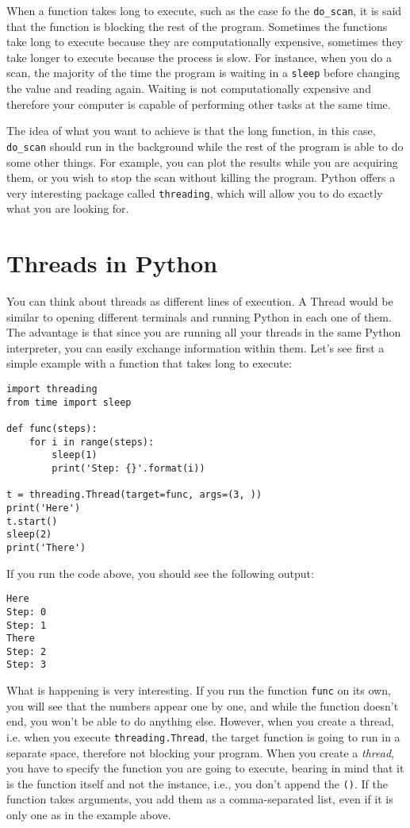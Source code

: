 When a function takes long to execute, such as the case fo the
\texttt{do_scan}, it is said that the function is blocking the rest of
the program. Sometimes the functions take long to execute because they
are computationally expensive, sometimes they take longer to execute
because the process is slow. For instance, when you do a scan, the
majority of the time the program is waiting in a \texttt{sleep} before
changing the value and reading again. Waiting is not computationally
expensive and therefore your computer is capable of performing other
tasks at the same time.

The idea of what you want to achieve is that the long function, in this
case, \texttt{do_scan} should run in the background while the rest of
the program is able to do some other things. For example, you can plot
the results while you are acquiring them, or you wish to stop the scan
without killing the program. Python offers a very interesting package
called \texttt{threading}, which will allow you to do exactly what you
are looking for.

\section{Threads in Python}\label{threads-inpython}
You can think about threads as different lines of execution. A Thread
would be similar to opening different terminals and running Python in
each one of them. The advantage is that since you are running all your
threads in the same Python interpreter, you can easily exchange
information within them. Let's see first a simple example with a
function that takes long to execute:

\begin{verbatim}
import threading
from time import sleep

def func(steps):
    for i in range(steps):
        sleep(1)
        print('Step: {}'.format(i))

t = threading.Thread(target=func, args=(3, ))
print('Here')
t.start()
sleep(2)
print('There')
\end{verbatim}

If you run the code above, you should see the following output:

\begin{verbatim}
Here
Step: 0
Step: 1
There
Step: 2
Step: 3
\end{verbatim}

What is happening is very interesting. If you run the function
\texttt{func} on its own, you will see that the numbers appear one by
one, and while the function doesn't end, you won't be able to do
anything else. However, when you create a thread, i.e. when you execute
\texttt{threading.Thread}, the target function is going to run in a
separate space, therefore not blocking your program. When you create a
\emph{thread}, you have to specify the function you are going to
execute, bearing in mind that it is the function itself and not the
instance, i.e., you don't append the \texttt{()}. If the function takes
arguments, you add them as a comma-separated list, even if it is only
one as in the example above.

